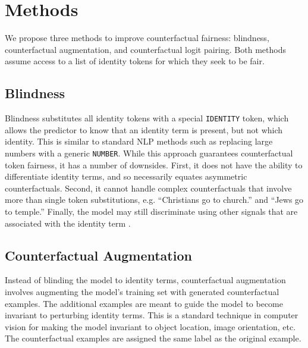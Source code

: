 \documentclass[letterpaper]{article} %
\newcommand{\identity}{\texttt{IDENTITY}\xspace}
\theoremstyle{definition}
\begin{document}
\section{Methods}

We propose three methods to improve counterfactual fairness: blindness, counterfactual augmentation, and counterfactual logit pairing. Both methods assume access to a list of identity tokens for which they seek to be fair.

\subsection{Blindness}
Blindness substitutes all identity tokens with a special \identity token, which allows the predictor to know that an identity term is present, but not which identity. This is similar to standard NLP methods such as replacing large numbers with a generic \texttt{NUMBER}\xspace.
While this approach guarantees counterfactual token fairness, it has a number of downsides.
First, it does not have the ability  to differentiate identity terms, and so necessarily equates asymmetric counterfactuals. Second,
it cannot handle complex counterfactuals that involve more than single token substitutions, e.g. ``Christians go to church.'' and ``Jews go to temple.''
Finally, the model may still discriminate using other signals that are associated with the identity term \cite{Dwork11}. 


\subsection{Counterfactual Augmentation}
Instead of blinding the model to identity terms, counterfactual augmentation involves augmenting the model's training set with generated counterfactual examples. The additional examples are meant to guide the model to become invariant to perturbing identity terms. This is a standard technique in computer vision for making the model invariant to object location, image orientation, etc. The counterfactual examples are assigned the same label as the original example. 
\end{document}
